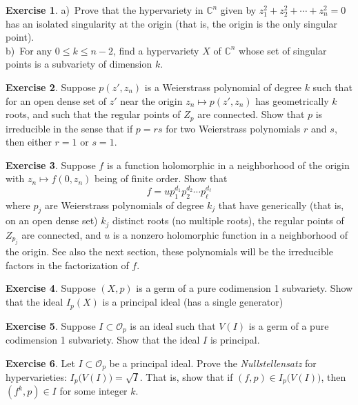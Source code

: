 \documentclass[12pt,openany]{book}
\newcommand{\C}{{\mathbb{C}}}
\newcommand{\sO}{{\mathcal{O}}}
\newcommand{\myindex}[1]{#1\index{#1}}
\theoremstyle{plain}
\theoremstyle{remark}
\theoremstyle{definition}
\newenvironment{exbox}{%
    \def\FrameCommand{\vrule width 1pt \relax\hspace {10pt}}%
    \MakeFramed {\advance \hsize -\width \FrameRestore }%
}{%
    \endMakeFramed
}
\theoremstyle{exercise}
\newtheorem{exercise}{Exercise}[section]
\theoremstyle{example}
\begin{document}
\begin{exbox}
\begin{exercise}
a)~Prove that the hypervariety in $\C^n$ given by $z_1^2 + z_2^2 + \cdots + z_n^2 = 0$
has an isolated singularity at the origin (that is, the origin is the only
singular point).\\
b)~For any $0 \leq k \leq n-2$, find a hypervariety $X$ of $\C^n$ whose set
of singular points is a subvariety of dimension $k$.
\end{exercise}

\begin{exercise}
Suppose $p(z',z_n)$ is a Weierstrass polynomial of degree $k$ such that
for an open dense set of $z'$ near the origin 
$z_n \mapsto p(z',z_n)$ has geometrically $k$ roots, and such that the
regular points of $Z_p$ are connected.  Show that $p$ is
irreducible in the sense that if $p = rs$ for two Weierstrass polynomials
$r$ and $s$, then either $r=1$ or $s=1$.
\end{exercise}

\begin{samepage}
\begin{exercise}
Suppose $f$ is a function holomorphic in a neighborhood of the origin with
$z_n \mapsto f(0,z_n)$ being of finite order.  Show that
\begin{equation*}
f = u p_1^{d_1} p_2^{d_2} \cdots p_\ell^{d_\ell}
\end{equation*}
where $p_j$ are Weierstrass polynomials of degree $k_j$ that have
generically (that is, on an open dense set) $k_j$ distinct roots
(no multiple roots), the regular points of $Z_{p_j}$ are
connected, and $u$ is a nonzero holomorphic function
in a neighborhood of the origin.  See also the next section, these
polynomials will be the irreducible factors in the factorization of $f$.
\end{exercise}
\end{samepage}

\begin{exercise}
Suppose $(X,p)$ is a germ of a pure codimension 1 subvariety.  Show that
the ideal $I_p(X)$ is a principal ideal (has a single generator)
\end{exercise}

\begin{exercise}
Suppose $I \subset \sO_p$ is an ideal such that $V(I)$ is a germ of a pure codimension 1 subvariety.  Show that
the ideal $I$ is principal.
\end{exercise}

\begin{exercise}
Let $I \subset \sO_p$ be a principal ideal.  Prove the
\emph{\myindex{Nullstellensatz}} for hypervarieties: 
$I_p\bigl(V(I)\bigr) = \sqrt{I}$.  That is, show that if 
$(f,p) \in I_p\bigl(V(I)\bigr)$, then $(f^k,p) \in I$ for some integer $k$.
\end{exercise}
\end{exbox}
\end{document}

